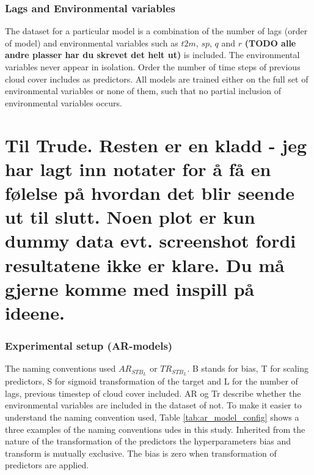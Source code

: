 \subsubsection{Lags and Environmental variables}
The dataset for a particular model is a combination of the number of lags (order of model) and environmental variables such as $t2m$, $sp$, $q$ and $r$ \textbf{(TODO alle andre plasser har du skrevet det helt ut)} is included. The environmental variables never appear in isolation.
Order the number of time steps of previous cloud cover includes as predictors. All models are trained either on the full set of environmental variables or none of them, such that no partial inclusion of environmental variables occurs. 

\section{Til Trude. Resten er en kladd - jeg har lagt inn notater for å få en følelse på hvordan det blir seende ut til slutt. Noen plot er kun dummy data evt. screenshot fordi resultatene ikke er klare. Du må gjerne komme med inspill på ideene.}

\subsubsection{Experimental setup (AR-models)}
The naming conventions used $AR_{STB_L}$ or $TR_{STB_L}$. B stands for bias, T for scaling predictors, S for sigmoid transformation of the target and L for the number of lags, previous timestep of cloud cover included. AR og Tr describe whether the environmental variables are included in the dataset of not. %
To make it easier to understand the naming convention used, Table \ref{tab:ar_model_config} shows a three examples of the naming conventions udes in this study. %
Inherited from the nature of the transformation of the predictors the hyperparameters bias and transform is mutually exclusive. The bias is zero when transformation of predictors are applied. 

